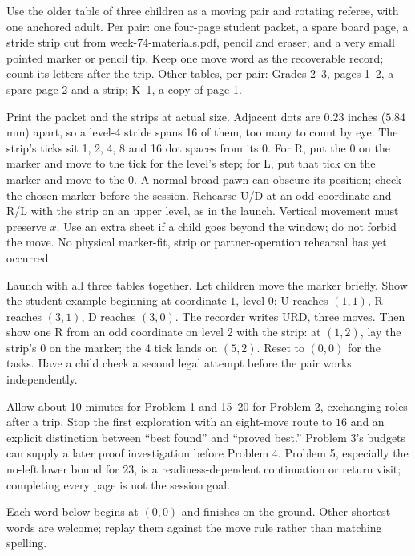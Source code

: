\documentclass[11pt,letterpaper]{article}
\newcommand{\sect}[1]{\par\vspace{5pt}{\large\bfseries #1}\par\nopagebreak}
\begin{document}
\sect{Materials and preparation}
Use the older table of three children as a moving pair and rotating referee,
with one anchored adult. Per pair: one four-page student packet, a spare board
page, a stride strip cut from week-74-materials.pdf, pencil and eraser, and a
very small pointed marker or pencil tip. Keep one move word as the recoverable
record; count its letters after the trip.
Other tables, per pair: Grades 2--3, pages 1--2, a spare page 2 and a strip;
K--1, a copy of page 1.

Print the packet and the strips at actual size. Adjacent dots are $0.23$ inches
($5.84$ mm) apart, so a level-4 stride spans 16 of them, too many to count by eye.
The strip's ticks sit 1, 2, 4, 8 and 16 dot spaces from its 0. For R, put the 0 on
the marker and move to the tick for the level's step; for L, put that tick on the
marker and move to the 0. A normal broad pawn can
obscure its position; check the chosen marker before the session. Rehearse U/D at an odd coordinate and R/L with the strip on an upper level, as
in the launch. Vertical movement must preserve $x$.
Use an extra sheet if a child goes beyond the window; do not forbid the move.
No physical marker-fit, strip or partner-operation rehearsal has yet occurred.

\sect{Launch and a feasible first visit}
Launch with all three tables together. Let children move the marker briefly. Show
the student example beginning at coordinate $1$, level $0$: U reaches $(1,1)$,
R reaches $(3,1)$, D reaches $(3,0)$. The recorder writes URD, three moves. Then
show one R from an odd coordinate on level 2 with the strip: at $(1,2)$, lay the
strip's 0 on the marker; the 4 tick lands on $(5,2)$. Reset to $(0,0)$ for the
tasks. Have a child check a second legal attempt before the pair works
independently.

Allow about 10 minutes for Problem 1 and 15--20 for Problem 2, exchanging roles
after a trip. Stop the first exploration with an eight-move route to $16$ and
an explicit distinction between ``best found'' and ``proved best.''
Problem 3's budgets can supply a later proof investigation before Problem 4.
Problem 5, especially the no-left lower bound for $23$, is a readiness-dependent
continuation or return visit; completing every page is not the session goal.

\sect{Answers and optional hints}
Each word below begins at $(0,0)$ and finishes on the ground. Other shortest
words are welcome; replay them against the move rule rather than matching spelling.
\end{document}
